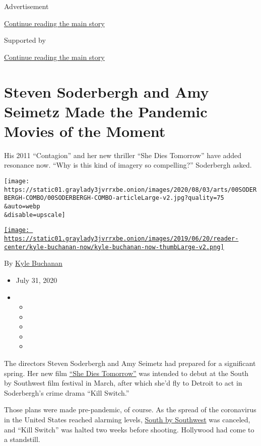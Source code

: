 Advertisement

\protect\hyperlink{after-top}{Continue reading the main story}

Supported by

\protect\hyperlink{after-sponsor}{Continue reading the main story}

\hypertarget{steven-soderbergh-and-amy-seimetz-made-the-pandemic-movies-of-the-moment}{%
\section{Steven Soderbergh and Amy Seimetz Made the Pandemic Movies of
the
Moment}\label{steven-soderbergh-and-amy-seimetz-made-the-pandemic-movies-of-the-moment}}

His 2011 ``Contagion'' and her new thriller ``She Dies Tomorrow'' have
added resonance now. ``Why is this kind of imagery so compelling?''
Soderbergh asked.

\texttt{[image: https://static01.graylady3jvrrxbe.onion/images/2020/08/03/arts/00SODERBERGH-COMBO/00SODERBERGH-COMBO-articleLarge-v2.jpg?quality=75\\\&auto=webp\\\&disable=upscale]}

\href{https://www.nytimes3xbfgragh.onion/by/kyle-buchanan}{\texttt{[image: https://static01.graylady3jvrrxbe.onion/images/2019/06/20/reader-center/kyle-buchanan-now/kyle-buchanan-now-thumbLarge-v2.png]}}

By \href{https://www.nytimes3xbfgragh.onion/by/kyle-buchanan}{Kyle
Buchanan}

\begin{itemize}
\item
  July 31, 2020
\item
  \begin{itemize}
  \item
  \item
  \item
  \item
  \item
  \end{itemize}
\end{itemize}

The directors Steven Soderbergh and Amy Seimetz had prepared for a
significant spring. Her new film
\href{https://www.youtube.com/watch?v=hcMFjCPkP3M}{``She Dies
Tomorrow''} was intended to debut at the South by Southwest film
festival in March, after which she'd fly to Detroit to act in
Soderbergh's crime drama ``Kill Switch.''

Those plans were made pre-pandemic, of course. As the spread of the
coronavirus in the United States reached alarming levels,
\href{https://www.nytimes3xbfgragh.onion/2020/03/06/arts/music/sxsw-cancelled.html}{South
by Southwest} was canceled, and ``Kill Switch'' was halted two weeks
before shooting. Hollywood had come to a standstill.

